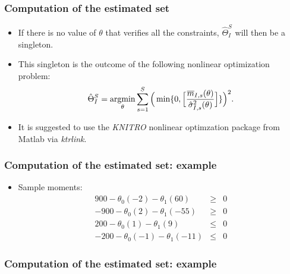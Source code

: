 \begin{frame}
\frametitle{Computation of the estimated set}

\begin{itemize}
	\item If there is no value of $\theta$ that verifies all the constraints, $\hat{\Theta}^{S}_{I}$ will then be a singleton.
	\item This singleton is the outcome of the following nonlinear optimization problem:
	\begin{equation*}
	\hat{\Theta}^{S}_{I} = \argmin_{\theta}\sum_{s=1}^{S}\Big(\min\{0,\Big[\frac{\overline{m}_{I,s}(\theta)}{\hat{\sigma}^{2}_{I,s}(\theta)}\Big]\}\Big)^{2}.
	\end{equation*}
	\item It is suggested to use the \textit{KNITRO} nonlinear optimzation package from Matlab via \textit{ktrlink}.
\end{itemize}
\end{frame}
\begin{frame}
\frametitle{Computation of the estimated set: example}

\begin{itemize}
	\item Sample moments:
	\begin{eqnarray*}
	900-\theta _{0}(-2)-\theta _{1}(60) &\geq &0 \\
	-900-\theta _{0}(2)-\theta _{1}(-55) &\geq &0 \\
	200-\theta _{0}(1)-\theta _{1}(9) &\leq &0 \\
	-200-\theta _{0}(-1)-\theta _{1}(-11) &\leq &0
	\end{eqnarray*}
\end{itemize}
\end{frame}
\begin{frame}
\frametitle{Computation of the estimated set: example}

\begin{figure}[h!]
\begin{center}
\end{center}
\end{figure}	
\end{frame}

